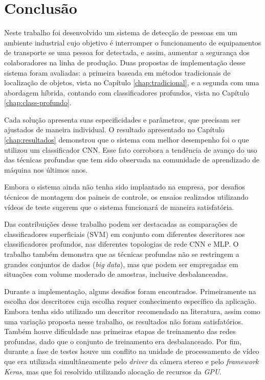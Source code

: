 \chapter{Conclusão} \label{chap:conclusao}

Neste trabalho foi desenvolvido um sistema de detecção de pessoas em um ambiente industrial cujo objetivo é interromper o funcionamento de equipamentos de transporte se uma pessoa for detectada, e assim, aumentar a segurança dos colaboradores na linha de produção. Duas propostas de implementação desse sistema foram avaliadas: a primeira baseada em métodos tradicionais de localização de objetos, vista no Capítulo \ref{chap:tradicional}, e a segunda com uma abordagem híbrida, contando com classificadores profundos, vista no Capítulo \ref{chap:class-profundo}. 

Cada solução apresenta suas especificidades e parâmetros, que precisam ser ajustados de maneira individual. O resultado apresentado no Capítulo \ref{chap:resultados} demonstrou que o sistema com melhor desempenho foi o que utilizou um classificador CNN. Esse fato corrobora a tendência de avanço do uso das técnicas profundas que tem sido observada na comunidade de aprendizado de máquina nos últimos anos.

Embora o sistema ainda não tenha sido implantado na empresa, por desafios técnicos de montagem dos paineis de controle, os ensaios realizados utilizando vídeos de teste sugerem que o sistema funcionará de maneira satisfatória.

Das contribuições desse trabalho podem ser destacadas as comparações de classificadores superficiais (SVM) em conjunto com diferentes descritores aos classificadores profundos, nas diferentes topologias de rede CNN e MLP. O trabalho também demonstra que as técnicas profundas não se restringem a grandes conjuntos de dados (\textit{big data}), mas que podem ser empregadas em situações com volume moderado de amostras, inclusive desbalanceadas.

Durante a implementação, alguns desafios foram encontrados. Primeiramente na escolha dos descritores cuja escolha requer conhecimento específico da aplicação. Embora tenha sido utilizado um descritor recomendado na literatura, assim como uma variação proposta nesse trabalho, os resultados não foram satisfatórios. Também houve dificuldade nas primeiras etapas de treinamento das redes profundas, dado que o conjunto de treinamento era desbalanceado. Por fim, durante a fase de testes houve um conflito na unidade de processamento de vídeo que era utilizada simultâneamente pelo \textit{driver} da câmera stereo e pelo \textit{framework Keras}, mas que foi resolvido utilizando alocação de recursos da \textit{GPU}.

